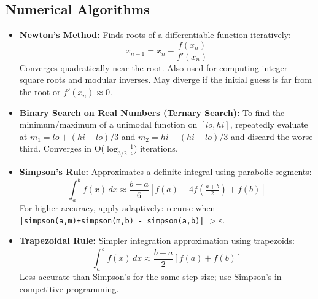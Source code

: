 \subsection{Numerical Algorithms}

\begin{itemize}
    \item \textbf{Newton's Method: } Finds roots of a differentiable function iteratively:
          \[
              x_{n+1} = x_n - \frac{f(x_n)}{f'(x_n)}
          \]
          Converges quadratically near the root. Also used for computing integer square roots and modular inverses. May diverge if the initial guess is far from the root or $f'(x_n) \approx 0$.

    \item \textbf{Binary Search on Real Numbers (Ternary Search): } To find the minimum/maximum of a unimodal function on $[lo, hi]$, repeatedly evaluate at $m_1 = lo + (hi-lo)/3$ and $m_2 = hi - (hi-lo)/3$ and discard the worse third. Converges in O($\log_{3/2} \frac{1}{\epsilon}$) iterations.

    \item \textbf{Simpson's Rule: } Approximates a definite integral using parabolic segments:
          \[
              \int_a^b f(x)\,dx \approx \frac{b-a}{6}\left[f(a) + 4f\!\left(\tfrac{a+b}{2}\right) + f(b)\right]
          \]
          For higher accuracy, apply adaptively: recurse when \texttt{|simpson(a,m)+simpson(m,b) - simpson(a,b)|} $> \varepsilon$.

    \item \textbf{Trapezoidal Rule: } Simpler integration approximation using trapezoids:
          \[
              \int_a^b f(x)\,dx \approx \frac{b-a}{2}[f(a) + f(b)]
          \]
          Less accurate than Simpson's for the same step size; use Simpson's in competitive programming.
\end{itemize}
